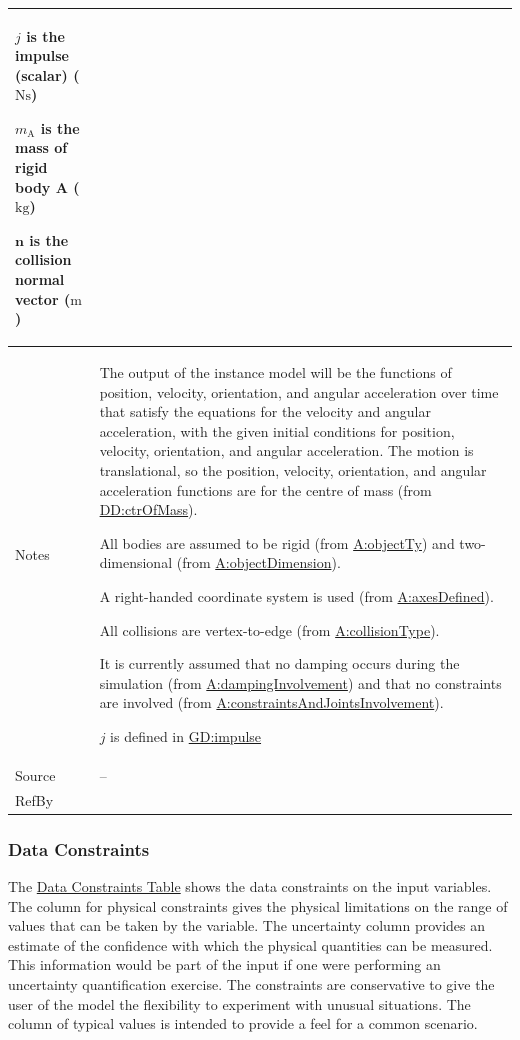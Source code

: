 \documentclass[12pt]{article}
\begin{document}
\begin{minipage}{\textwidth}
\begin{tabular}{>{\raggedright}p{}>{\raggedright\arraybackslash}p{}}
\begin{symbDescription}
              \item{$j$ is the impulse (scalar) ($\text{N}\text{s}$)}
              \item{${m_{\text{A}}}$ is the mass of rigid body A (${\text{kg}}$)}
              \item{$\symbf{n}$ is the collision normal vector (${\text{m}}$)}
              \end{symbDescription}
\\ \midrule
Notes & The output of the instance model will be the functions of position, velocity, orientation, and angular acceleration over time that satisfy the equations for the velocity and angular acceleration, with the given initial conditions for position, velocity, orientation, and angular acceleration. The motion is translational, so the position, velocity, orientation, and angular acceleration functions are for the centre of mass (from \hyperref[DD:ctrOfMass]{DD:ctrOfMass}).
        
        All bodies are assumed to be rigid (from \hyperref[assumpOT]{A:objectTy}) and two-dimensional (from \hyperref[assumpOD]{A:objectDimension}).
        
        A right-handed coordinate system is used (from \hyperref[assumpAD]{A:axesDefined}).
        
        All collisions are vertex-to-edge (from \hyperref[assumpCT]{A:collisionType}).
        
        It is currently assumed that no damping occurs during the simulation (from \hyperref[assumpDI]{A:dampingInvolvement}) and that no constraints are involved (from \hyperref[assumpCAJI]{A:constraintsAndJointsInvolvement}).
        
        $j$ is defined in \hyperref[GD:impulse]{GD:impulse}
        
\\ \midrule
Source & --
         
\\ \midrule
RefBy & 
\\ \bottomrule
\end{tabular}
\end{minipage}

\subsubsection{Data Constraints}
\label{Sec:DataConstraints}
The \hyperref[Table:InDataConstraints]{Data Constraints Table} shows the data constraints on the input variables. The column for physical constraints gives the physical limitations on the range of values that can be taken by the variable. The uncertainty column provides an estimate of the confidence with which the physical quantities can be measured. This information would be part of the input if one were performing an uncertainty quantification exercise. The constraints are conservative to give the user of the model the flexibility to experiment with unusual situations. The column of typical values is intended to provide a feel for a common scenario.
\end{document}
